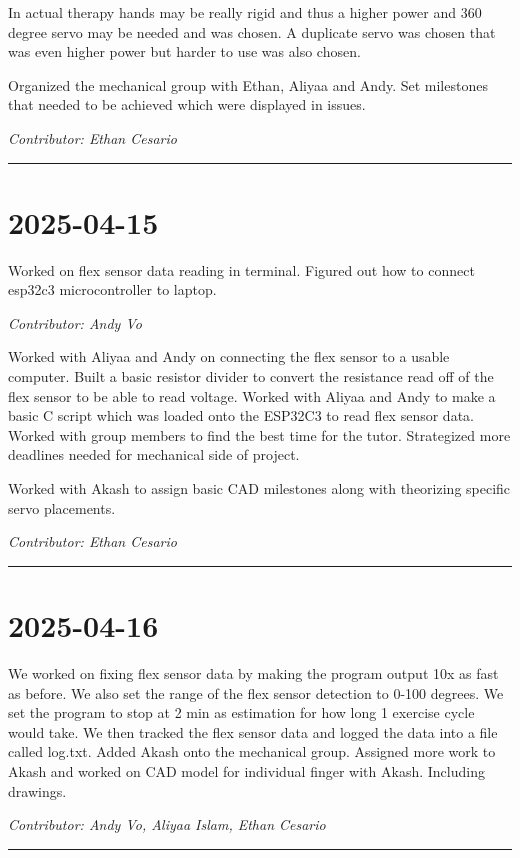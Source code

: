 \documentclass[12pt]{article}
\begin{document}
In actual therapy hands may be really rigid and thus a higher power and 360 degree servo may be needed and was chosen. A duplicate servo was chosen that was even higher power but harder to use was also chosen.

Organized the mechanical group with Ethan, Aliyaa and Andy. Set milestones that needed to be achieved which were displayed in issues. 

\vspace{1em}
\noindent\textit{Contributor: Ethan Cesario}
\vspace{1em}
\hrule


\section*{2025-04-15}
Worked on flex sensor data reading in terminal. Figured out how to connect esp32c3 microcontroller to laptop.


\vspace{1em}
\noindent\textit{Contributor: Andy Vo}
\vspace{1em}

Worked with Aliyaa and Andy on connecting the flex sensor to a usable computer. Built a basic resistor divider to convert the resistance read off of the flex sensor to be able to read voltage. Worked with Aliyaa and Andy to make a basic C script which was loaded onto the ESP32C3 to read flex sensor data. Worked with group members to find the best time for the tutor. Strategized more deadlines needed for mechanical side of project.

Worked with Akash to assign basic CAD milestones along with theorizing specific servo placements.

\vspace{1em}
\noindent\textit{Contributor: Ethan Cesario}
\vspace{1em}

\hrule

\section*{2025-04-16}
We worked on fixing flex sensor data by making the program output 10x as fast as before. We also set the range of the flex sensor detection to 0-100 degrees. 
We set the program to stop at 2 min as estimation for how long 1 exercise cycle would take. We then tracked the flex sensor data and logged the data into a file called log.txt.
Added Akash onto the mechanical group. Assigned more work to Akash and worked on CAD model for individual finger with Akash. Including drawings.

\vspace{1em}
\noindent\textit{Contributor: Andy Vo, Aliyaa Islam, Ethan Cesario}
\vspace{1em}
\hrule
\end{document}
